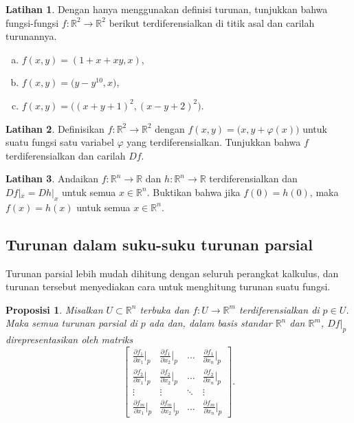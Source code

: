 \documentclass[12pt,openany]{book}
\newcommand{\R}{{\mathbb{R}}}
\theoremstyle{plain}
\newtheorem{prop}[thm]{Proposisi}
\theoremstyle{remark}
\theoremstyle{definition}
\newenvironment{exbox}{%
    \def\FrameCommand{\vrule width 1pt \relax\hspace{10pt}}%
    \MakeFramed{\advance\hsize-\width\FrameRestore}%
}{%
    \endMakeFramed
}
\newenvironment{exparts}{%
    \leavevmode\begin{enumerate}[a),noitemsep,topsep=0pt,parsep=0pt,partopsep=0pt]
}{%
    \end{enumerate}
}
\theoremstyle{exercise}
\newtheorem{exercise}{Latihan}[section]
\theoremstyle{example}
\begin{document}
\begin{exbox}
\begin{exercise}
Dengan hanya menggunakan definisi turunan, tunjukkan bahwa
fungsi-fungsi $f \colon \R^2 \to \R^2$ berikut terdiferensialkan di titik asal dan
carilah turunannya.
\begin{exparts}
\item
$f(x,y) = (1+x+xy,x)$,
\item
$f(x,y) = \bigl(y-y^{10},x \bigr)$,
\item
$f(x,y) = \bigl( {(x+y+1)}^2 , {(x-y+2)}^2 \bigr)$.
\end{exparts}
\end{exercise}

\begin{exercise}
Definisikan $f \colon \R^2 \to \R^2$ dengan $f(x,y) =
\bigl(x,y+\varphi(x)\bigr)$ untuk suatu fungsi satu variabel $\varphi$ yang
terdiferensialkan.  Tunjukkan bahwa $f$ terdiferensialkan dan carilah $Df$.
\end{exercise}

\begin{exercise}
Andaikan $f \colon \R^n \to \R$ dan $h \colon \R^n \to \R$
terdiferensialkan dan $Df|_x = Dh|_x$ untuk semua $x \in \R^n$.
Buktikan bahwa
jika $f(0) = h(0)$, maka $f(x) = h(x)$ untuk semua $x \in \R^n$.
\end{exercise}
\end{exbox}


\subsection{Turunan dalam suku-suku turunan parsial}

Turunan parsial lebih mudah dihitung dengan seluruh perangkat
kalkulus, dan turunan tersebut menyediakan cara untuk menghitung turunan suatu
fungsi.

\begin{prop} \label{mv:prop:jacobianmatrix}
Misalkan $U \subset \R^n$ terbuka dan $f \colon U \to \R^m$
terdiferensialkan di $p \in U$.  Maka semua turunan parsial di $p$
ada dan, dalam basis standar $\R^n$ dan $\R^m$,
$Df|_p$ direpresentasikan oleh matriks
\begin{equation*}
\begin{bmatrix}
\frac{\partial f_1}{\partial x_1}\big|_p
&
\frac{\partial f_1}{\partial x_2}\big|_p
& \ldots &
\frac{\partial f_1}{\partial x_n}\big|_p
\\[6pt]
\frac{\partial f_2}{\partial x_1}\big|_p
&
\frac{\partial f_2}{\partial x_2}\big|_p
& \ldots &
\frac{\partial f_2}{\partial x_n}\big|_p
\\
\vdots & \vdots & \ddots & \vdots
\\
\frac{\partial f_m}{\partial x_1}\big|_p
&
\frac{\partial f_m}{\partial x_2}\big|_p
& \ldots &
\frac{\partial f_m}{\partial x_n}\big|_p
\end{bmatrix} .
\end{equation*}
\end{prop}
\end{document}
